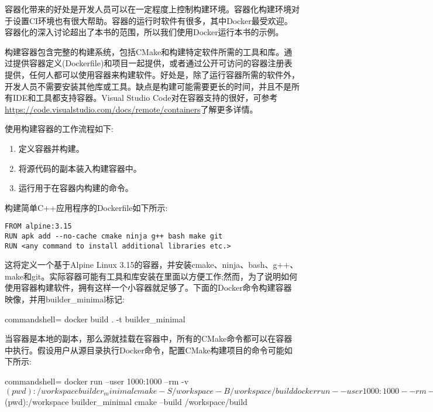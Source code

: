 容器化带来的好处是开发人员可以在一定程度上控制构建环境。容器化构建环境对于设置CI环境也有很大帮助。容器的运行时软件有很多，其中Docker最受欢迎。容器化的深入讨论超出了本书的范围，所以我们使用Docker运行本书的示例。

构建容器包含完整的构建系统，包括CMake和构建特定软件所需的工具和库。通过提供容器定义(Dockerfile)和项目一起提供，或者通过公开可访问的容器注册表提供，任何人都可以使用容器来构建软件。好处是，除了运行容器所需的软件外，开发人员不需要安装其他库或工具。缺点是构建可能需要更长的时间，并且不是所有IDE和工具都支持容器。Visual Studio Code对在容器支持的很好，可参考\url{https://code.visualstudio.com/docs/remote/containers}了解更多详情。

使用构建容器的工作流程如下:

\begin{enumerate}
\item 
定义容器并构建。

\item 
将源代码的副本装入构建容器中。

\item 
运行用于在容器内构建的命令。
\end{enumerate}

构建简单C++应用程序的Dockerfile如下所示:

\begin{lstlisting}[style=styleCMake]
FROM alpine:3.15
RUN apk add --no-cache cmake ninja g++ bash make git
RUN <any command to install additional libraries etc.>
\end{lstlisting}

这将定义一个基于Alpine Linux 3.15的容器，并安装cmake、ninja、bash、g++、make和git。实际容器可能有工具和库安装在里面以方便工作;然而，为了说明如何使用容器构建软件，拥有这样一个小容器就足够了。下面的Docker命令构建容器映像，并用builder\_minimal标记:

\begin{tcblisting}{commandshell={}}
docker build . -t builder_minimal
\end{tcblisting}

当容器是本地的副本，那么源就挂载在容器中，所有的CMake命令都可以在容器中执行。假设用户从源目录执行Docker命令，配置CMake构建项目的命令可能如下所示:

\begin{tcblisting}{commandshell={}}
docker run --user 1000:1000 --rm -v $(pwd):/workspace
  builder_minimal cmake -S /workspace -B /workspace/build
docker run --user 1000:1000 --rm -v $(pwd):/workspace
  builder_minimal cmake --build /workspace/build
\end{tcblisting}


